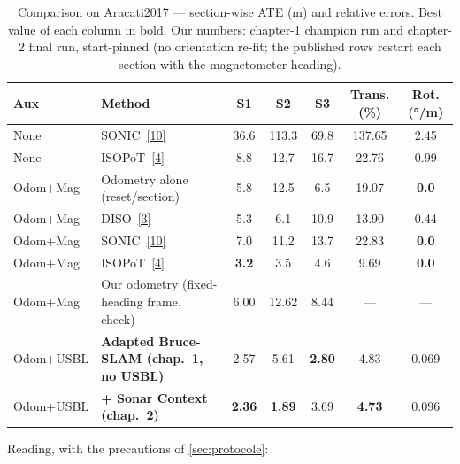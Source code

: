 \begin{table}[H]
\centering
\caption{Comparison on Aracati2017 — section-wise ATE (m) and relative errors.
Best value of each column in bold. Our numbers: chapter-1 champion run and
chapter-2 final run, start-pinned (no orientation re-fit; the published rows
restart each section with the magnetometer heading).}
\label{tab:compare}
\begin{tabular}{llccccc}
\hline
Aux & Method & S1 & S2 & S3 & Trans. (\%) & Rot. (°/m) \\
\hline
None & SONIC~\hyperref[bib:sonic]{[10]} & 36.6 & 113.3 & 69.8 & 137.65 & 2.45 \\
None & ISOPoT~\hyperref[bib:isopot]{[4]} & 8.8 & 12.7 & 16.7 & 22.76 & 0.99 \\
Odom+Mag & Odometry alone (reset/section) & 5.8 & 12.5 & 6.5 & 19.07 & \textbf{0.0} \\
Odom+Mag & DISO~\hyperref[bib:diso]{[3]} & 5.3 & 6.1 & 10.9 & 13.90 & 0.44 \\
Odom+Mag & SONIC~\hyperref[bib:sonic]{[10]} & 7.0 & 11.2 & 13.7 & 22.83 & \textbf{0.0} \\
Odom+Mag & ISOPoT~\hyperref[bib:isopot]{[4]} & \textbf{3.2} & 3.5 & 4.6 & 9.69 & \textbf{0.0} \\
\hline
Odom+Mag & Our odometry (fixed-heading frame, check) & 6.00 & 12.62 & 8.44 & — & — \\
Odom+USBL & \textbf{Adapted Bruce-SLAM (chap.~1, no USBL)} & 2.57 & 5.61 & \textbf{2.80} & 4.83 & 0.069 \\
Odom+USBL & \textbf{+ Sonar Context (chap.~2)} & \textbf{2.36} & \textbf{1.89} & 3.69 & \textbf{4.73} & 0.096 \\
\hline
\end{tabular}
\end{table}

\noindent Reading, with the precautions of \autoref{sec:protocole}:


